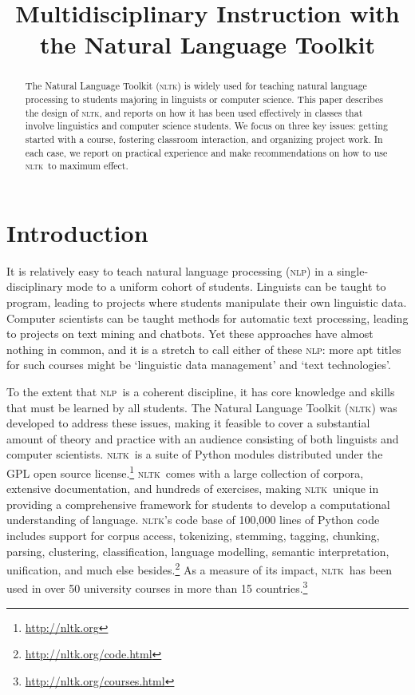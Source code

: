 \documentclass[11pt]{article}
\title{Multidisciplinary Instruction with the Natural Language Toolkit}
\author{}
\date{}
\newcommand{\NLP}{\textsc{nlp}}
\newcommand{\NLTK}{\textsc{nltk}}
\begin{document}
\maketitle
\begin{abstract}
  The Natural Language Toolkit (\NLTK) is widely used for teaching
  natural language processing to students majoring in linguists or
  computer science.  This paper describes the design of \NLTK, and
  reports on how it has been used effectively in classes that involve
  linguistics and computer science students.  We focus
  on three key issues: getting started with a course, fostering
  classroom interaction, and organizing project work.
  In each case, we report on practical experience and make
  recommendations on how to use \NLTK\ to maximum effect.
\end{abstract}

\section{Introduction}

It is relatively easy to teach natural language processing (\NLP) in a
single-disciplinary mode to a uniform cohort of students.  Linguists
can be taught to program, leading to projects where students
manipulate their own linguistic data.  Computer scientists can be
taught methods for automatic text processing, leading to projects on
text mining and chatbots.  Yet these approaches have almost nothing in
common, and it is a stretch to call either of these \NLP: more apt
titles for such courses might be `linguistic data management' and
`text technologies'.

To the extent that \NLP\ is a coherent discipline, it has core knowledge
and skills that must be learned by all students.
The Natural Language Toolkit (\NLTK) was developed to address
these issues, making it feasible to cover a substantial amount of
theory and practice with an audience consisting
of both linguists and computer scientists.
\NLTK\ is a suite of Python modules
distributed under the GPL open source license.\footnote{\url{http://nltk.org}}
\NLTK\ comes with a large collection of corpora, extensive
documentation, and hundreds of exercises, making
\NLTK\ unique in providing a comprehensive framework for
students to develop a computational understanding of language.
\NLTK's code base of 100,000 lines of Python code includes
support for corpus access, tokenizing, stemming, tagging, chunking,
parsing, clustering, classification, language modelling, semantic
interpretation, unification, and much else besides.\footnote{\url{http://nltk.org/code.html}}
As a measure of its impact,
\NLTK\ has been used in over 50 university courses in more than 15
countries.\footnote{\url{http://nltk.org/courses.html}}
\end{document}
